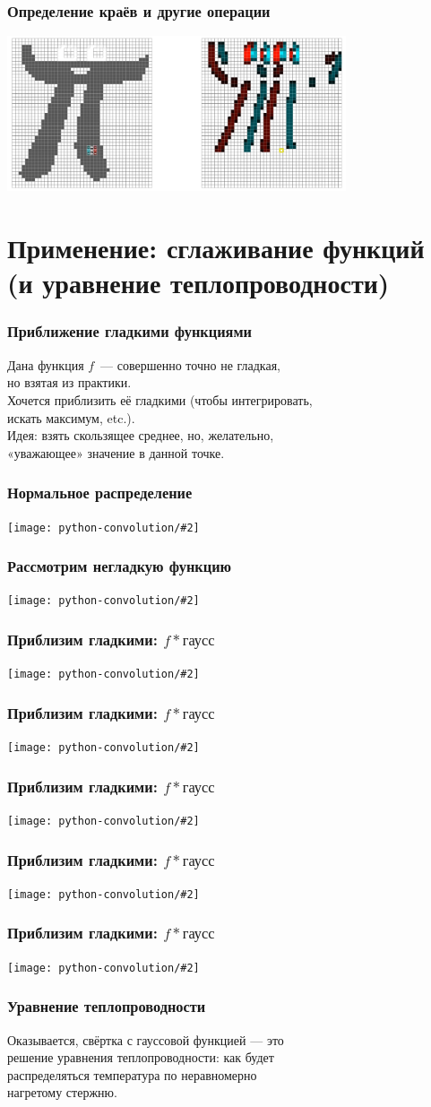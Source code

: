 \documentclass[11pt,aspectratio=169,svgnames]{beamer}
\newcommand{\graslide}[2]{
   \begin{frame} \frametitle{#1}
      \texttt{[image: python-convolution/\#2]}
   \end{frame}
}
\begin{document}
\begin{frame} \frametitle{Определение краёв и другие операции}
	\begin{center}
	   \includegraphics[width=0.75\textwidth]{img/conv-ridge}
	\end{center}
\end{frame}

\section{Применение: сглаживание функций (и уравнение теплопроводности)}

\begin{frame} \frametitle{Приближение гладкими функциями}
	Дана функция \(f\)~— совершенно точно не гладкая,\\
	но взятая из практики. \bigskip \\

	Хочется приблизить её гладкими (чтобы интегрировать, \\
	искать максимум, etc.). \bigskip \\

	Идея: взять скользящее среднее, но, желательно, \\
	«уважающее» значение в данной точке.	
\end{frame}

\graslide{Нормальное распределение}{normal}
\graslide{Рассмотрим негладкую функцию}{smoothing-0}
\graslide{Приблизим гладкими: \(f * \text{гаусс}\)}{smoothing-2.00}
\graslide{Приблизим гладкими: \(f * \text{гаусс}\)}{smoothing-1.00}
\graslide{Приблизим гладкими: \(f * \text{гаусс}\)}{smoothing-0.50}
\graslide{Приблизим гладкими: \(f * \text{гаусс}\)}{smoothing-0.20}
\graslide{Приблизим гладкими: \(f * \text{гаусс}\)}{smoothing-0.05}

\begin{frame} \frametitle{Уравнение теплопроводности}
	Оказывается, свёртка с гауссовой функцией — это \\
	решение уравнения теплопроводности: как будет \\
	распределяться температура по неравномерно \\
	нагретому стержню.
\end{frame}
\end{document}
